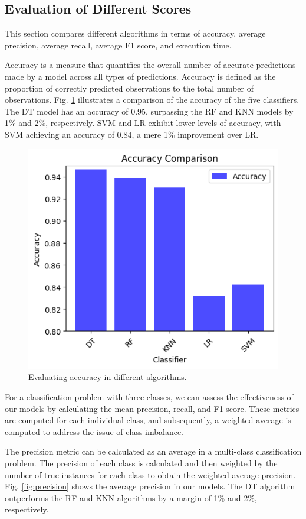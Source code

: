 \documentclass[conference]{IEEEtran}
\begin{document}
\subsection{Evaluation of Different Scores}
This section compares different algorithms in terms of accuracy, average precision, average recall, average F1 score, and execution time.

Accuracy is a measure that quantifies the overall number of accurate predictions made by a model across all types of predictions. Accuracy is defined as the proportion of correctly predicted observations to the total number of observations. Fig. \ref{fig:accuracy} illustrates a comparison of the accuracy of the five classifiers. The DT model has an accuracy of 0.95, surpassing the RF and KNN models by 1\% and 2\%, respectively. SVM and LR exhibit lower levels of accuracy, with SVM achieving an accuracy of 0.84, a mere 1\% improvement over LR.

\begin{figure}
    \centering
    \includegraphics[width=0.6\columnwidth]{accuracy_comparison.png}
    \caption{Evaluating accuracy in different algorithms.}
    \label{fig:accuracy}
    \vspace{-6mm}
\end{figure}

For a classification problem with three classes, we can assess the effectiveness of our models by calculating the mean precision, recall, and F1-score. These metrics are computed for each individual class, and subsequently, a weighted average is computed to address the issue of class imbalance.

The precision metric can be calculated as an average in a multi-class classification problem. The precision of each class is calculated and then weighted by the number of true instances for each class to obtain the weighted average precision. Fig. \ref{fig:precision} shows the average precision in our models. The DT algorithm outperforms the RF and KNN algorithms by a margin of 1\% and 2\%, respectively.
\end{document}
